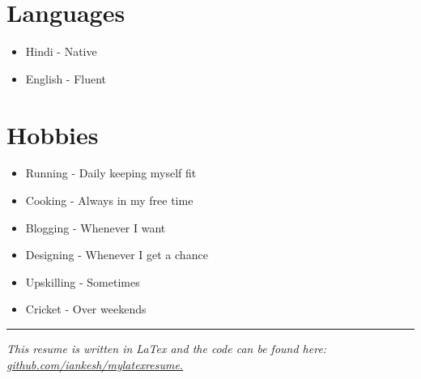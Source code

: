 \documentclass[11pt, a4paper]{article}
\begin{document}
\section*{\color{NavyBlue}Languages}
\vspace{-2mm}
\begin{itemize}[noitemsep, nolistsep,label=\textcolor{NavyBlue}{\scriptsize\faLanguage}]
\item Hindi - Native
\item English - Fluent
\end{itemize}

\section*{\color{NavyBlue}Hobbies}
\vspace{-2mm}
\begin{itemize}[noitemsep, nolistsep,label=\textcolor{NavyBlue}{\scriptsize\faStar}]
\item Running - Daily keeping myself fit
\item Cooking - Always in my free time
\item Blogging - Whenever I want
\item Designing - Whenever I get a chance
\item Upskilling - Sometimes
\item Cricket - Over weekends
\end{itemize}

\textcolor{NavyBlue}{\rule{6.8in}{0.2mm}}
\vspace{-8mm}
\center \small \textit {This resume is written in LaTex and the code can be found here: {\href{https://github.com/iankesh/mylatexresume}{github.com/iankesh/mylatexresume.}}}
\end{document}
